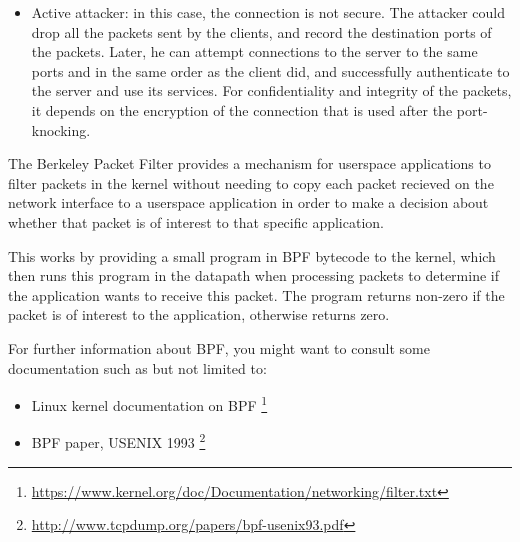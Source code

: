 \documentclass[11pt, a4paper, addpoints, answers]{exam}
\begin{document}
\begin{questions}
\begin{parts}
\begin{solution}
\begin{itemize}
			\item Active attacker: in this case, the connection is not secure. The attacker could drop all the packets sent by the clients, and record the destination ports of the packets. Later, he can attempt connections to the server to the same ports and in the same order as the client did, and successfully authenticate to the server and use its services.
				For confidentiality and integrity of the packets, it depends on the encryption of the connection that is used after the port-knocking.

		\end{itemize}
    \end{solution}
\end{parts}

\question The Berkeley Packet Filter provides a mechanism for userspace applications to filter packets in the kernel without needing to copy each packet recieved on the network interface to a userspace application in order to make a decision about whether that packet is of interest to that specific application.

This works by providing a small program in BPF bytecode to the kernel, which
then runs this program in the datapath when processing packets to determine if
the application wants to receive this packet. The program returns non-zero if
the packet is of interest to the application, otherwise returns zero.


For further information about BPF, you might want to consult some documentation such as but not limited to:

\begin{itemize}
    \item Linux kernel documentation on BPF \footnote{\url{https://www.kernel.org/doc/Documentation/networking/filter.txt}}
    \item BPF paper, USENIX 1993 \footnote{\url{http://www.tcpdump.org/papers/bpf-usenix93.pdf}}
\end{itemize}

\begin{parts}

\end{parts}
\end{questions}
\end{document}
